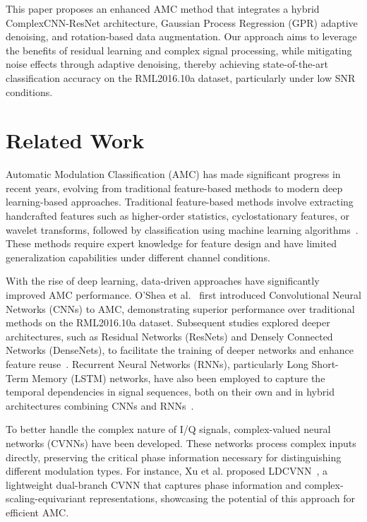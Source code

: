 \documentclass[conference]{IEEEtran}
\begin{document}
This paper proposes an enhanced AMC method that integrates a hybrid ComplexCNN-ResNet architecture, Gaussian Process Regression (GPR) adaptive denoising, and rotation-based data augmentation. Our approach aims to leverage the benefits of residual learning and complex signal processing, while mitigating noise effects through adaptive denoising, thereby achieving state-of-the-art classification accuracy on the RML2016.10a dataset, particularly under low SNR conditions.

\section{Related Work}

Automatic Modulation Classification (AMC) has made significant progress in recent years, evolving from traditional feature-based methods to modern deep learning-based approaches. Traditional feature-based methods involve extracting handcrafted features such as higher-order statistics, cyclostationary features, or wavelet transforms, followed by classification using machine learning algorithms~\cite{hazza2013overview}. These methods require expert knowledge for feature design and have limited generalization capabilities under different channel conditions.

With the rise of deep learning, data-driven approaches have significantly improved AMC performance. O'Shea et al.~\cite{oshea2016convolutional} first introduced Convolutional Neural Networks (CNNs) to AMC, demonstrating superior performance over traditional methods on the RML2016.10a dataset. Subsequent studies explored deeper architectures, such as Residual Networks (ResNets) and Densely Connected Networks (DenseNets), to facilitate the training of deeper networks and enhance feature reuse~\cite{west2017deep, patil2021automatic}. Recurrent Neural Networks (RNNs), particularly Long Short-Term Memory (LSTM) networks, have also been employed to capture the temporal dependencies in signal sequences, both on their own and in hybrid architectures combining CNNs and RNNs~\cite{rajendran2018deep, xu2020spatiotemporal}.

To better handle the complex nature of I/Q signals, complex-valued neural networks (CVNNs) have been developed. These networks process complex inputs directly, preserving the critical phase information necessary for distinguishing different modulation types. For instance, Xu et al. proposed LDCVNN~\cite{xu2025ldcvnn}, a lightweight dual-branch CVNN that captures phase information and complex-scaling-equivariant representations, showcasing the potential of this approach for efficient AMC.
\end{document}
